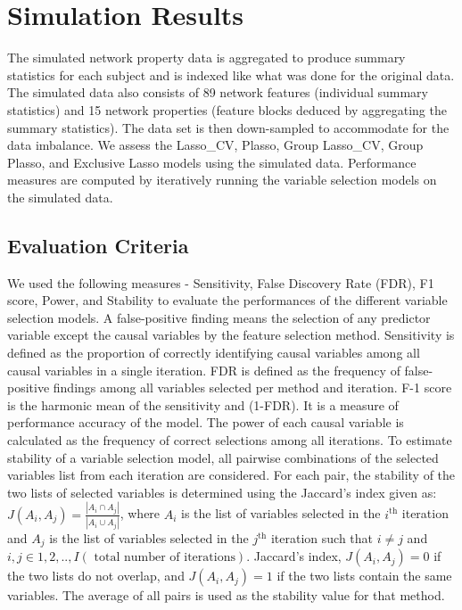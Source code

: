\section{Simulation Results}\label{sec:simresults}
The simulated network property data is aggregated to produce summary statistics for each subject and is indexed like what was done for the original data. The simulated data also consists of 89 network features (individual summary statistics) and 15 network properties (feature blocks deduced by aggregating the summary statistics). The data set is then down-sampled to accommodate for the data imbalance. We assess the Lasso\_CV, Plasso, Group Lasso\_CV, Group Plasso, and Exclusive Lasso models using the simulated data. Performance measures are computed by iteratively running the variable selection models on the simulated data.\par

\subsection{Evaluation Criteria} \label{subsec:evalcrt}
We used the following measures - Sensitivity, False Discovery Rate (FDR), F1 score, Power, and Stability to evaluate the
performances of the different variable selection models. A false-positive finding means the selection of any predictor variable except the causal variables by the feature selection method. Sensitivity is defined as the proportion of correctly identifying causal variables among all causal variables in a single iteration. FDR is defined as the frequency of false-positive findings among all variables selected per method and
iteration. F-1 score is the harmonic mean of the sensitivity and (1-FDR). It is a measure of performance accuracy of the model. The power of each causal variable is calculated as the frequency of correct selections among all iterations. To estimate stability of a variable selection model, all pairwise combinations of the selected variables list from each iteration are considered. For each pair, the stability of the two lists of selected variables is determined using the Jaccard’s index given as: $J(A_i,A_j)=\frac{|A_i\cap A_j|}{|A_i\cup A_j|}$, where $A_i$ is the list of variables selected in the $i^{\text{th}}$ iteration and $A_j$ is the list of variables selected in the $j^{\text{th}}$ iteration such that $i\ne j$ and $i,j\in 1,2,..,I (\text{ total number of iterations})$. Jaccard's index, $J(A_i,A_j)=0$ if the two lists do not overlap, and $J(A_i,A_j)=1$ if the two lists contain the same variables. The average of all pairs is used as the stability value for that method.

